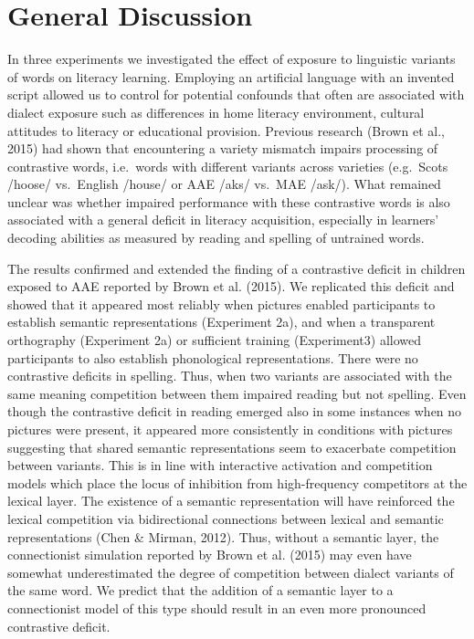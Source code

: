 \documentclass[doc,floatsintext]{apa6}
\begin{document}
\section{General Discussion}\label{general-discussion}

In three experiments we investigated the effect of exposure to
linguistic variants of words on literacy learning. Employing an
artificial language with an invented script allowed us to control for
potential confounds that often are associated with dialect exposure such
as differences in home literacy environment, cultural attitudes to
literacy or educational provision. Previous research (Brown et al.,
2015) had shown that encountering a variety mismatch impairs processing
of contrastive words, i.e.~words with different variants across
varieties (e.g.~Scots /hoose/ vs.~English /house/ or AAE /aks/ vs.~MAE
/ask/). What remained unclear was whether impaired performance with
these contrastive words is also associated with a general deficit in
literacy acquisition, especially in learners' decoding abilities as
measured by reading and spelling of untrained words.

The results confirmed and extended the finding of a contrastive deficit
in children exposed to AAE reported by Brown et al. (2015). We
replicated this deficit and showed that it appeared most reliably when
pictures enabled participants to establish semantic representations
(Experiment 2a), and when a transparent orthography (Experiment 2a) or
sufficient training (Experiment3) allowed participants to also establish
phonological representations. There were no contrastive deficits in
spelling. Thus, when two variants are associated with the same meaning
competition between them impaired reading but not spelling. Even though
the contrastive deficit in reading emerged also in some instances when
no pictures were present, it appeared more consistently in conditions
with pictures suggesting that shared semantic representations seem to
exacerbate competition between variants. This is in line with
interactive activation and competition models which place the locus of
inhibition from high-frequency competitors at the lexical layer. The
existence of a semantic representation will have reinforced the lexical
competition via bidirectional connections between lexical and semantic
representations (Chen \& Mirman, 2012). Thus, without a semantic layer,
the connectionist simulation reported by Brown et al. (2015) may even
have somewhat underestimated the degree of competition between dialect
variants of the same word. We predict that the addition of a semantic
layer to a connectionist model of this type should result in an even
more pronounced contrastive deficit.
\end{document}
